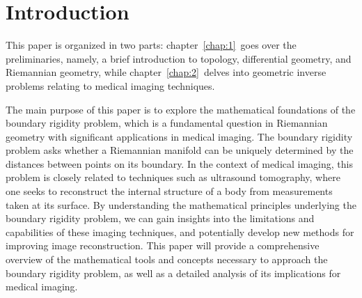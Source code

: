 \section{Introduction}
\label{sec:introduction}

\noindent
This paper is organized in two parts: chapter~\ref{chap:1}~goes over the preliminaries, namely, a brief introduction to topology, differential geometry, and Riemannian geometry, while chapter~\ref{chap:2}~delves into geometric inverse problems relating to medical imaging techniques.

The main purpose of this paper is to explore the mathematical foundations of the boundary rigidity problem, which is a fundamental question in Riemannian geometry with significant applications in medical imaging. The boundary rigidity problem asks whether a Riemannian manifold can be uniquely determined by the distances between points on its boundary. In the context of medical imaging, this problem is closely related to techniques such as ultrasound tomography, where one seeks to reconstruct the internal structure of a body from measurements taken at its surface. By understanding the mathematical principles underlying the boundary rigidity problem, we can gain insights into the limitations and capabilities of these imaging techniques, and potentially develop new methods for improving image reconstruction. This paper will provide a comprehensive overview of the mathematical tools and concepts necessary to approach the boundary rigidity problem, as well as a detailed analysis of its implications for medical imaging.
